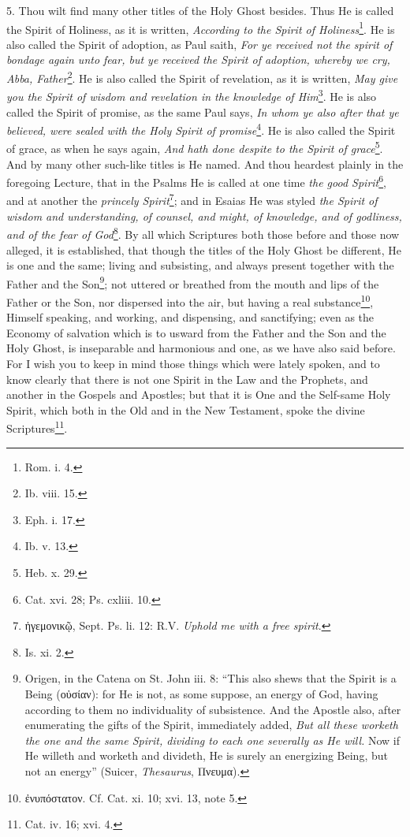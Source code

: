 5. Thou wilt find many other titles of the Holy Ghost besides. Thus He is called the Spirit of Holiness, as it is written, \emph{According to the Spirit of Holiness}\footnote{Rom. i. 4.}. He is also called the Spirit of adoption, as Paul saith, \emph{For ye received not the spirit of bondage again unto fear, but ye received the Spirit of adoption, whereby we cry, Abba, Father}\footnote{Ib. viii. 15.}. He is also called the Spirit of revelation, as it is written, \emph{May give you the Spirit of wisdom and revelation in the knowledge of Him}\footnote{Eph. i. 17.}. He is also called the Spirit of promise, as the same Paul says, \emph{In whom ye also after that ye believed, were sealed with the Holy Spirit of promise}\footnote{Ib. v. 13.}. He is also called the Spirit of grace, as when he says again, \emph{And hath done despite to the Spirit of grace}\footnote{Heb. x. 29.}. And by many other such-like titles is He named. And thou heardest plainly in the foregoing Lecture, that in the Psalms He is called at one time \emph{the good Spirit}\footnote{Cat. xvi. 28; Ps. cxliii. 10.}, and at another the \emph{princely Spirit}\footnote{\textgreek{ἡγεμονικῷ}, Sept. Ps. li. 12: \textsc{R.V.} \emph{Uphold me with a free spirit}.}; and in Esaias He was styled \emph{the Spirit of wisdom and understanding, of counsel, and might, of knowledge, and of godliness, and of the fear of God}\footnote{Is. xi. 2.}. By all which Scriptures both those before and those now alleged, it is established, that though the titles of the Holy Ghost be different, He is one and the same; living and subsisting, and always present together with the Father and the Son\footnote{Origen, in the Catena on St. John iii. 8: “This also shews that the Spirit is a Being (\textgreek{οὐσίαν}): for He is not, as some suppose, an energy of God, having according to them no individuality of subsistence. And the Apostle also, after enumerating the gifts of the Spirit, immediately added, \emph{But all these worketh the one and the same Spirit, dividing to each one severally as He will.} Now if He willeth and worketh and divideth, He is surely an energizing Being, but not an energy” (Suicer, \emph{Thesaurus}, \textgreek{Πνευμα}).}; not uttered or breathed from the mouth and lips of the Father or the Son, nor dispersed into the air, but having a real substance\footnote{\textgreek{ἐνυπόστατον}. Cf. Cat. xi. 10; xvi. 13, note 5.}, Himself speaking, and working, and dispensing, and sanctifying; even as the Economy of salvation which is to usward from the Father and the Son and the Holy Ghost, is inseparable and harmonious and one, as we have also said before. For I wish you to keep in mind those things which were lately spoken, and to know clearly that there is not one Spirit in the Law and the Prophets, and another in the Gospels and Apostles; but that it is One and the Self-same Holy Spirit, which both in the Old and in the New Testament, spoke the divine Scriptures\footnote{Cat. iv. 16; xvi. 4.}.

